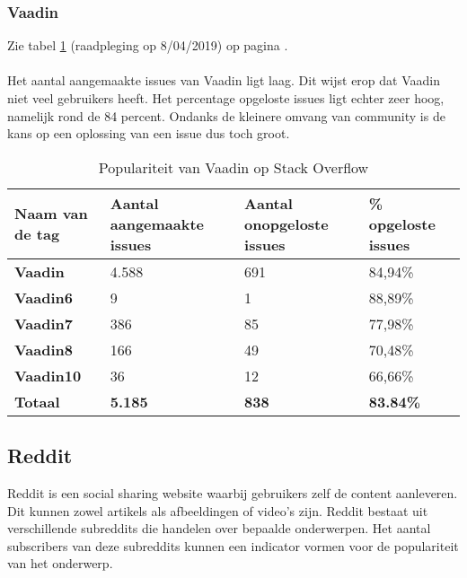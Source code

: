 \subsubsection{Vaadin}
Zie tabel \ref{table:vaadinstackoverflow} (raadpleging op 8/04/2019) op pagina \pageref{table:vaadinstackoverflow}. \\ \\
Het aantal aangemaakte issues van Vaadin ligt laag. Dit wijst erop dat Vaadin niet veel gebruikers heeft. Het percentage opgeloste issues ligt echter zeer hoog, namelijk rond de 84 percent. Ondanks de kleinere omvang van community is de kans op een oplossing van een issue dus toch groot. \\

\begin{table}[H]
	\begin{tabular}{|l|l|l|l|}
		\hline
		Naam van de tag   & \textbf{Aantal aangemaakte issues} & \textbf{Aantal onopgeloste issues} & \textbf{\% opgeloste issues} \\ \hline
		\textbf{Vaadin}  & 4.588                            & 691                             & 84,94\%                              \\ \hline
		\textbf{Vaadin6} & 9                              & 1                              & 88,89\%                              \\ \hline
		\textbf{Vaadin7} & 386                              & 85                              & 77,98\%                              \\ \hline
		\textbf{Vaadin8} & 166                                & 49                                & 70,48\%                              \\ \hline
		\textbf{Vaadin10} & 36                                & 12                                & 66,66\%                              \\ \hline
		\textbf{Totaal}   & \textbf{5.185}                   & \textbf{838}                    & \textbf{83.84\%}                     \\ \hline
	\end{tabular}
	\caption{Populariteit van Vaadin op Stack Overflow}
	\label{table:vaadinstackoverflow}
\end{table}

\subsection{Reddit}
Reddit is een social sharing website waarbij gebruikers zelf de content aanleveren. Dit kunnen zowel artikels als afbeeldingen of video's zijn. Reddit bestaat uit verschillende subreddits die handelen over bepaalde onderwerpen. Het aantal subscribers van deze subreddits kunnen een indicator vormen voor de populariteit van het onderwerp.\\

